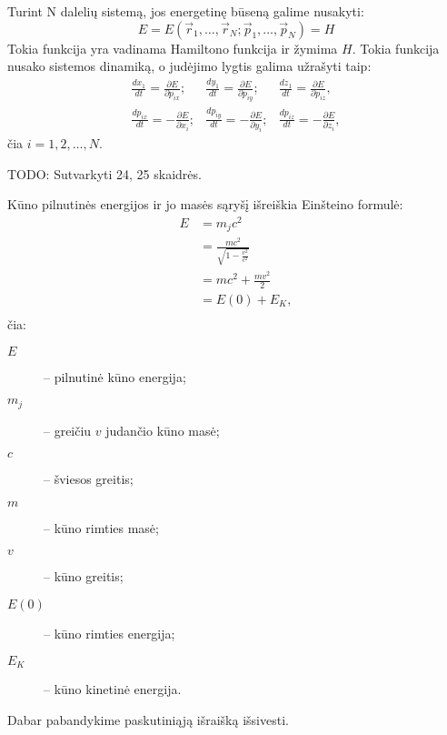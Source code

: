Turint N dalelių sistemą, jos energetinę būseną galime nusakyti:
\begin{equation*}
  E = E(\vec{r}_{1},\ldots,\vec{r}_{N}; \vec{p}_{1},\ldots,\vec{p}_{N}) = H
\end{equation*}
Tokia funkcija yra vadinama Hamiltono funkcija ir žymima $H$. Tokia
funkcija nusako sistemos dinamiką, o judėjimo lygtis galima
užrašyti taip:
\begin{align}
  \frac{dx_{1}}{dt} = \frac{\partial E}{\partial p_{ix}};&
  \frac{dy_{1}}{dt} = \frac{\partial E}{\partial p_{iy}};&
  \frac{dz_{1}}{dt} = \frac{\partial E}{\partial p_{iz}},
  \label{eq:hamiltono_lygtis_1} \\
  \frac{dp_{ix}}{dt} = -\frac{\partial E}{\partial x_{i}}; &
  \frac{dp_{iy}}{dt} = -\frac{\partial E}{\partial y_{i}}; &
  \frac{dp_{iz}}{dt} = -\frac{\partial E}{\partial z_{i}},
  \label{eq:hamiltono_lygtis_2}
\end{align}
čia $i = 1,2,\ldots,N$.

TODO: Sutvarkyti 24, 25 skaidrės.

Kūno pilnutinės energijos ir jo masės sąryšį išreiškia Einšteino
formulė:
\begin{align*}
  E
  &= m_{j}c^{2} \\
  &= \frac{mc^{2}}{\sqrt{1 - \frac{v^{2}}{c^{2}}}} \\
  &= mc^{2} + \frac{mv^{2}}{2} \\
  &= E(0) + E_{K}, \\
\end{align*}
čia:
\begin{description}
  \item[$E$] – pilnutinė kūno energija;
  \item[$m_{j}$] – greičiu $v$ judančio kūno masė;
  \item[$c$] – šviesos greitis;
  \item[$m$] – kūno rimties masė;
  \item[$v$] – kūno greitis;
  \item[$E(0)$] – kūno rimties energija;
  \item[$E_{K}$] – kūno kinetinė energija.
\end{description}
Dabar pabandykime paskutiniąją išraišką išsivesti.


